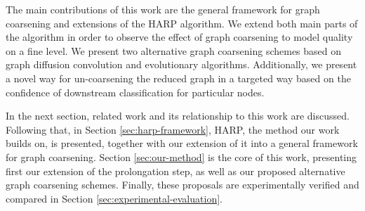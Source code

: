 
The main contributions of this work are the general framework for graph coarsening and extensions of the HARP algorithm. We extend both main parts of the algorithm in order to observe the effect of graph coarsening to model quality on a fine level. We present two alternative graph coarsening schemes based on graph diffusion convolution and evolutionary algorithms. Additionally, we present a novel way for un-coarsening the reduced graph in a targeted way based on the confidence of downstream classification for particular nodes.

In the next section, related work and its relationship to this work are discussed. Following that, in Section \ref{sec:harp-framework}, HARP, the method our work builds on, is presented, together with our extension of it into a general framework for graph coarsening. Section \ref{sec:our-method} is the core of this work, presenting first our extension of the prolongation step, as well as our proposed alternative graph coarsening schemes. Finally, these proposals are experimentally verified and compared in Section \ref{sec:experimental-evaluation}.

